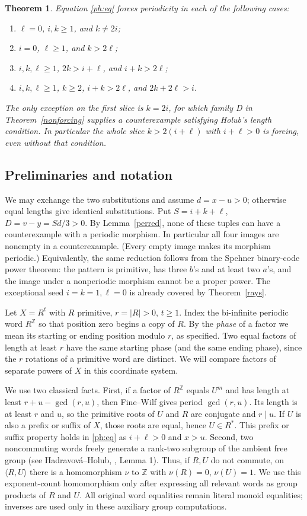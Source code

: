 \documentclass[11pt]{article}
\newtheorem{theorem}{Theorem}
\theoremstyle{remark}\newtheorem*{remark}{Remark}
\begin{document}
\begin{theorem}\label{ph:main}
Equation \eqref{ph:eq} forces periodicity in each of the following cases:
\begin{enumerate}
\item $\ell=0$, $i,k\ge1$, and $k\ne2i$;
\item $i=0$, $\ell\ge1$, and $k>2\ell$;
\item $i,k,\ell\ge1$, $2k>i+\ell$, and $i+k>2\ell$;
\item $i,k,\ell\ge1$, $k\ge2$, $i+k>2\ell$, and $2k+2\ell>i$.
\end{enumerate}
The only exception on the first slice is $k=2i$, for which family D in
Theorem~\ref{nonforcing} supplies a counterexample satisfying Holub's
length condition. In particular the whole slice $k>2(i+\ell)$ with
$i+\ell>0$ is forcing, even without that condition.
\end{theorem}

\subsection{Preliminaries and notation}
We may exchange the two substitutions and assume $d=x-u>0$;
otherwise equal lengths give identical substitutions. Put
$S=i+k+\ell$, $D=v-y=Sd/3>0$. By Lemma~\ref{perred}, none of
these tuples can have a counterexample with a periodic morphism.
In particular all four images are nonempty in a counterexample. (Every
empty image makes its morphism periodic.) Equivalently, the same
reduction follows from the Spehner binary-code power theorem: the
pattern is primitive, has three $b$'s and at least two $a$'s, and the
image under a nonperiodic morphism cannot be a proper power.
The exceptional seed $i=k=1,\ell=0$ is already covered by
Theorem~\ref{rays}.

Let $X=R^t$ with $R$ primitive, $r=|R|>0$, $t\ge1$. Index the
bi-infinite periodic word $R^{\mathbb Z}$ so that position zero begins a
copy of $R$. By the \emph{phase} of a factor we mean its starting or
ending position modulo $r$, as specified. Two equal factors of length
at least $r$ have the same starting phase (and the same ending phase),
since the $r$ rotations of a primitive word are distinct. We will
compare factors of separate powers of $X$ in this coordinate system.

We use two classical facts. First, if a factor of $R^{\mathbb Z}$ equals
$U^m$ and has length at least $r+u-\gcd(r,u)$, then Fine--Wilf gives
period $\gcd(r,u)$. Its length is at least $r$ and $u$, so the primitive
roots of $U$ and $R$ are conjugate and $r\mid u$. If $U$ is also a prefix
or suffix of $X$, those roots are equal, hence $U\in R^*$. This prefix
or suffix property holds in \eqref{ph:eq} as $i+\ell>0$ and $x>u$.
Second, two noncommuting words freely generate a rank-two subgroup of
the ambient free group (see Hadravov\'a--Holub, \cite{hh}, Lemma 1).
Thus, if $R,U$ do not commute, on $\langle R,U\rangle$ there is a
homomorphism $\nu$ to $\mathbb Z$ with $\nu(R)=0$, $\nu(U)=1$.
We use this exponent-count homomorphism only after expressing all
relevant words as group products of $R$ and $U$. All original word
equalities remain literal monoid equalities; inverses are used only in
these auxiliary group computations.
\end{document}

